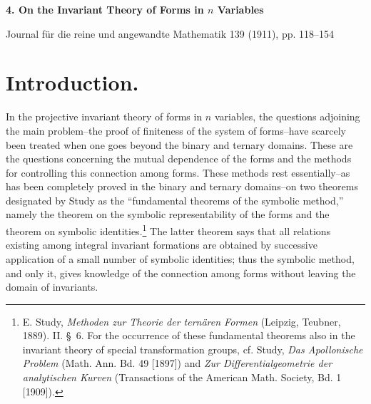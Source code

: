 \documentclass[11pt]{article}
\begin{document}
\clearpage
\begin{center}
{\Large\bfseries 4. On the Invariant Theory of Forms in $n$ Variables}\par
\vspace{1.2em}
Journal für die reine und angewandte Mathematik 139 (1911), pp. 118--154
\end{center}

\section*{Introduction.}
In the projective invariant theory of forms in $n$ variables, the questions adjoining the main problem--the proof of finiteness of the system of forms--have scarcely been treated when one goes beyond the binary and ternary domains. These are the questions concerning the mutual dependence of the forms and the methods for controlling this connection among forms. These methods rest essentially--as has been completely proved in the binary and ternary domains--on two theorems designated by Study as the ``fundamental theorems of the symbolic method,'' namely the theorem on the symbolic representability of the forms and the theorem on symbolic identities.\footnote{E. Study, \emph{Methoden zur Theorie der ternären Formen} (Leipzig, Teubner, 1889). II. \S\ 6. For the occurrence of these fundamental theorems also in the invariant theory of special transformation groups, cf. Study, \emph{Das Apollonische Problem} (Math. Ann. Bd. 49 [1897]) and \emph{Zur Differentialgeometrie der analytischen Kurven} (Transactions of the American Math. Society, Bd. 1 [1909]).} The latter theorem says that all relations existing among integral invariant formations are obtained by successive application of a small number of symbolic identities; thus the symbolic method, and only it, gives knowledge of the connection among forms without leaving the domain of invariants.
\end{document}

